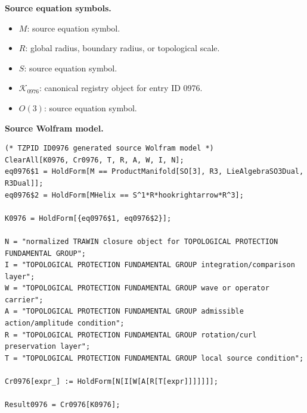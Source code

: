 \begin{minipage}[t]{0.49\linewidth}
\begingroup
\small
\raggedright
\textbf{Source equation symbols.}\par
\begin{itemize}[leftmargin=1.35em,itemsep=1pt,topsep=1pt,parsep=0pt]
    \item $M$: source equation symbol.
    \item $R$: global radius, boundary radius, or topological scale.
    \item $S$: source equation symbol.
    \item $\mathcal{K}_{0976}$: canonical registry object for entry ID 0976.
    \item $O(3)$: source equation symbol.
\end{itemize}
\endgroup
\end{minipage}\hfill
\begin{minipage}[t]{0.47\linewidth}
\begingroup
\scriptsize
\raggedright
\textbf{Source Wolfram model.}\par
\begin{Verbatim}[fontsize=\tiny,breaklines=true,breakanywhere=true]
(* TZPID ID0976 generated source Wolfram model *)
ClearAll[K0976, Cr0976, T, R, A, W, I, N];
eq0976$1 = HoldForm[M == ProductManifold[SO[3], R3, LieAlgebraSO3Dual, R3Dual]];
eq0976$2 = HoldForm[MHelix == S^1*R*hookrightarrow*R^3];

K0976 = HoldForm[{eq0976$1, eq0976$2}];

N = "normalized TRAWIN closure object for TOPOLOGICAL PROTECTION FUNDAMENTAL GROUP";
I = "TOPOLOGICAL PROTECTION FUNDAMENTAL GROUP integration/comparison layer";
W = "TOPOLOGICAL PROTECTION FUNDAMENTAL GROUP wave or operator carrier";
A = "TOPOLOGICAL PROTECTION FUNDAMENTAL GROUP admissible action/amplitude condition";
R = "TOPOLOGICAL PROTECTION FUNDAMENTAL GROUP rotation/curl preservation layer";
T = "TOPOLOGICAL PROTECTION FUNDAMENTAL GROUP local source condition";

Cr0976[expr_] := HoldForm[N[I[W[A[R[T[expr]]]]]]];

Result0976 = Cr0976[K0976];
\end{Verbatim}
\endgroup
\end{minipage}

